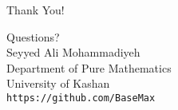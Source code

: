 \documentclass[xcolor=table]{beamer}
\begin{document}
\begin{frame}{Thank You!}
    \begin{center}
        \Huge Questions?\\[1cm]
        \normalsize Seyyed Ali Mohammadiyeh\\
        Department of Pure Mathematics\\
        University of Kashan\\
        \texttt{https://github.com/BaseMax}
    \end{center}
\end{frame}
\end{document}
